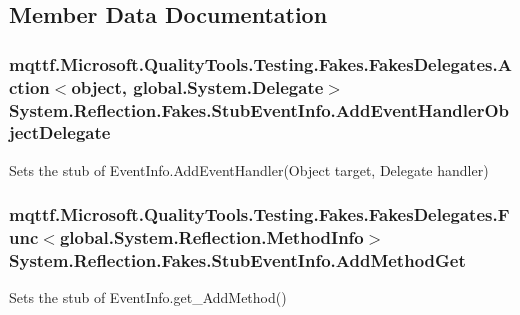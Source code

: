 \subsection{Member Data Documentation}
\hypertarget{class_system_1_1_reflection_1_1_fakes_1_1_stub_event_info_aee3152623971856b7659510c1be6197a}{
\subsubsection[{Add\-Event\-Handler\-Object\-Delegate}]{\setlength{\rightskip}{0pt plus 5cm}mqttf.\-Microsoft.\-Quality\-Tools.\-Testing.\-Fakes.\-Fakes\-Delegates.\-Action$<$object, global.\-System.\-Delegate$>$ System.\-Reflection.\-Fakes.\-Stub\-Event\-Info.\-Add\-Event\-Handler\-Object\-Delegate}}\label{class_system_1_1_reflection_1_1_fakes_1_1_stub_event_info_aee3152623971856b7659510c1be6197a}


Sets the stub of Event\-Info.\-Add\-Event\-Handler(\-Object target, Delegate handler)

\hypertarget{class_system_1_1_reflection_1_1_fakes_1_1_stub_event_info_a6c9e2d85de7f4bac0a8c87bfde87475d}{
\subsubsection[{Add\-Method\-Get}]{\setlength{\rightskip}{0pt plus 5cm}mqttf.\-Microsoft.\-Quality\-Tools.\-Testing.\-Fakes.\-Fakes\-Delegates.\-Func$<$global.\-System.\-Reflection.\-Method\-Info$>$ System.\-Reflection.\-Fakes.\-Stub\-Event\-Info.\-Add\-Method\-Get}}\label{class_system_1_1_reflection_1_1_fakes_1_1_stub_event_info_a6c9e2d85de7f4bac0a8c87bfde87475d}


Sets the stub of Event\-Info.\-get\-\_\-\-Add\-Method()

